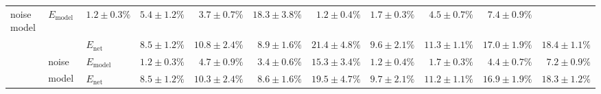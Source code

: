 \begin{sidewaystable}
\begin{tabular}{p{2.2cm} p{1.7cm} l r r r r r r r r }
{	noise model} &
	$E_\mathrm{model}$ & 
	\color{Gray}$1.2 \pm 0.3\%$ & \color{Gray}$5.4 \pm 1.2\%$ & \color{Gray}$3.7 \pm 0.7\%$ & \color{Gray}$18.3 \pm 3.8\%$ & \color{Gray}$1.2 \pm 0.4\%$ & \color{Gray}$1.7 \pm 0.3\%$ & \color{Gray}$4.5 \pm 0.7\%$ & \color{Gray}$7.4 \pm 0.9\%$
	\\
	& & 
	$E_\mathrm{net}$ &
	\cellcolor{White!13!SteelBlue}$8.5 \pm 1.2\%$ & \cellcolor{White!19!SteelBlue}$10.8 \pm 2.4\%$ & \cellcolor{White!19!SteelBlue}$8.9 \pm 1.6\%$ & \cellcolor{White!32!SteelBlue}$21.4 \pm 4.8\%$ & \cellcolor{White!25!SteelBlue}$9.6 \pm 2.1\%$ & \cellcolor{White!7!SteelBlue}$11.3 \pm 1.1\%$ & \cellcolor{White!7!SteelBlue}$17.0 \pm 1.9\%$ & \cellcolor{White!7!SteelBlue}$18.4 \pm 1.1\%$
	\\\cmidrule(l){2-11}
	&
	\multirow{2}{1.7cm}{\raggedleft %
	noise model\textsuperscript{\dag}} &
	$E_\mathrm{model}$ & 
	\color{Gray}$1.2 \pm 0.3\%$ & \color{Gray}$4.7 \pm 0.9\%$ & \color{Gray}$3.4 \pm 0.6\%$ & \color{Gray}$15.3 \pm 3.4\%$ & \color{Gray}$1.2 \pm 0.4\%$ & \color{Gray}$1.7 \pm 0.3\%$ & \color{Gray}$4.4 \pm 0.7\%$ & \color{Gray}$7.2 \pm 0.9\%$
	\\
	& & 
	$E_\mathrm{net}$ &
	\cellcolor{White!7!SteelBlue}$8.5 \pm 1.2\%$ & \cellcolor{White!32!SteelBlue}$10.3 \pm 2.4\%$ & \cellcolor{White!25!SteelBlue}$8.6 \pm 1.6\%$ & \cellcolor{White!50!SteelBlue}$19.5 \pm 4.7\%$ & \cellcolor{White!19!SteelBlue}$9.7 \pm 2.1\%$ & \cellcolor{White!13!SteelBlue}$11.2 \pm 1.1\%$ & \cellcolor{White!13!SteelBlue}$16.9 \pm 1.9\%$ & \cellcolor{White!13!SteelBlue}$18.3 \pm 1.2\%$
	\\
	\bottomrule
	\end{tabular}
\end{sidewaystable}
